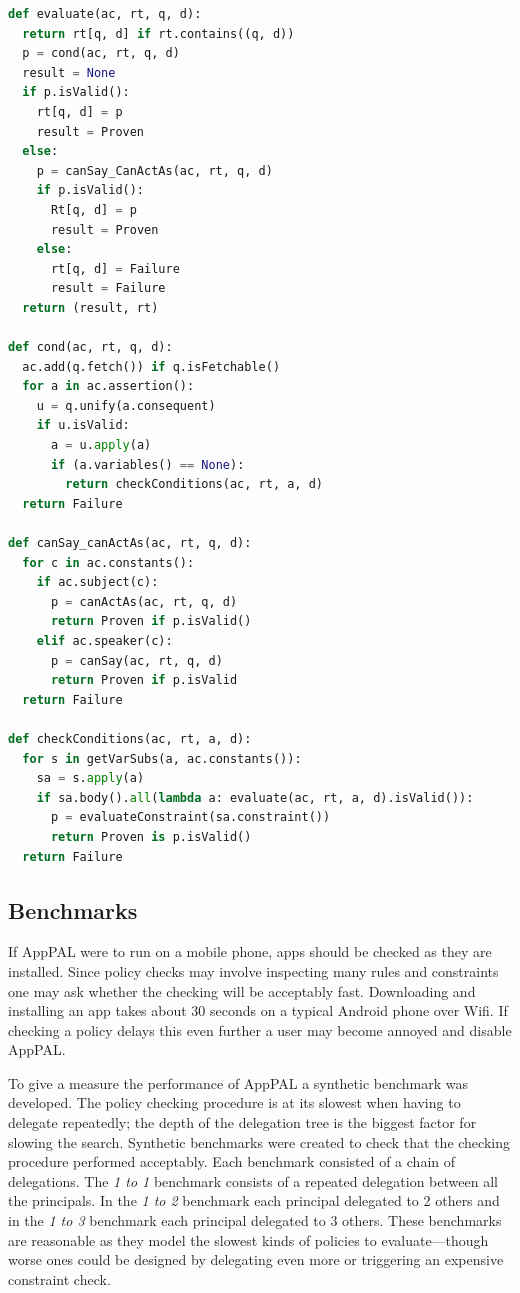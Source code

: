\documentclass[thesis.tex]{subfiles}
\begin{document}
\begin{lstlisting}[language=Python, float, caption={Pseudocode for evaluating AppPAL.}]
def evaluate(ac, rt, q, d):
  return rt[q, d] if rt.contains((q, d))
  p = cond(ac, rt, q, d)
  result = None
  if p.isValid():
    rt[q, d] = p
    result = Proven
  else:
    p = canSay_CanActAs(ac, rt, q, d)
    if p.isValid():
      Rt[q, d] = p
      result = Proven
    else:
      rt[q, d] = Failure
      result = Failure
  return (result, rt)

def cond(ac, rt, q, d):
  ac.add(q.fetch()) if q.isFetchable()
  for a in ac.assertion():
    u = q.unify(a.consequent)
    if u.isValid:
      a = u.apply(a)
      if (a.variables() == None):
        return checkConditions(ac, rt, a, d)
  return Failure

def canSay_canActAs(ac, rt, q, d):
  for c in ac.constants():
    if ac.subject(c):
      p = canActAs(ac, rt, q, d)
      return Proven if p.isValid()
    elif ac.speaker(c):
      p = canSay(ac, rt, q, d)
      return Proven if p.isValid
  return Failure

def checkConditions(ac, rt, a, d):
  for s in getVarSubs(a, ac.constants()):
    sa = s.apply(a)
    if sa.body().all(lambda a: evaluate(ac, rt, a, d).isValid()):
      p = evaluateConstraint(sa.constraint())
      return Proven is p.isValid()
  return Failure
\end{lstlisting}

\subsection{Benchmarks}
\label{ssec:benchmarks}

If AppPAL were to run on a mobile phone, apps should be checked as they are installed.
Since policy checks may involve inspecting many rules and constraints one may ask whether the checking will be acceptably fast.
Downloading and installing an app takes about 30 seconds on a typical Android phone over Wifi.
If checking a policy delays this even further a user may become annoyed and disable AppPAL.

To give a measure the performance of AppPAL a synthetic benchmark was developed.
The policy checking procedure is at its slowest when having to delegate repeatedly;
the depth of the delegation tree is the biggest factor for slowing the search.
Synthetic benchmarks were created to check that the checking procedure performed acceptably.
Each benchmark consisted of a chain of delegations.
The \emph{1 to 1} benchmark consists of a repeated delegation between all the principals.
In the \emph{1 to 2} benchmark each principal delegated to 2 others and in the \emph{1 to 3} benchmark each principal delegated to 3 others.
These benchmarks are reasonable as they model the slowest kinds of policies to
evaluate---though worse ones could be designed by delegating even more or triggering an expensive constraint check.
\end{document}
